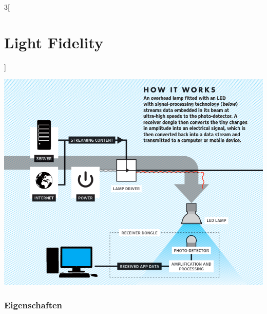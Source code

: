 \begin{multicols}{3}[\section{Light Fidelity}]
\begin{Figure}
\includegraphics[width=\linewidth]{Kapitel/lifi/Grafiken/How.jpg}
\label{fig:LiFi_how}
\end{Figure}

\subsubsection*{Eigenschaften}


\end{multicols}
